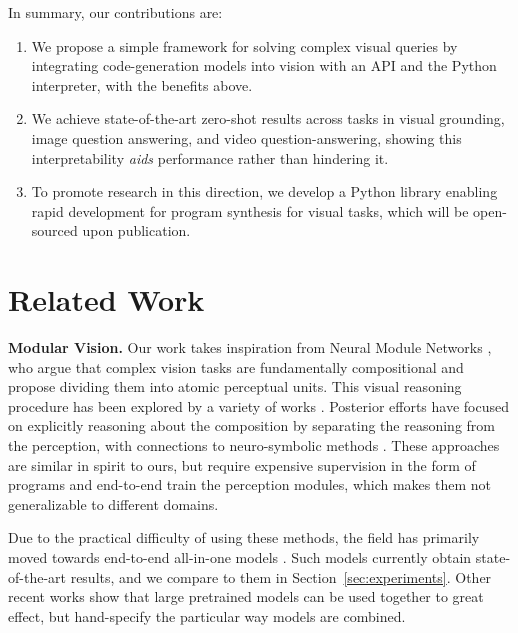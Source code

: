 \documentclass[10pt,twocolumn,letterpaper]{article}
\begin{document}
In summary, our contributions are:
\begin{enumerate}[topsep=0pt,itemsep=-1ex,partopsep=1ex,parsep=1ex]
    \item We propose a simple framework for solving complex visual queries by integrating code-generation models into vision with an API and the Python interpreter, with the benefits above.
    \item We achieve state-of-the-art zero-shot results across tasks in visual grounding, image question answering, and video question-answering, showing this interpretability \textit{aids} performance rather than hindering it.
    \item To promote research in this direction, we develop a Python library enabling rapid development for program synthesis for visual tasks, which will be open-sourced upon publication. 
\end{enumerate}

\section{Related Work}

\textbf{Modular Vision.} Our work takes inspiration from Neural Module Networks \cite{Andreas_2016_CVPR,johnson_inferring_2017}, who argue that complex vision tasks are fundamentally compositional and propose dividing them into atomic perceptual units. This visual reasoning procedure has been explored by a variety of works \cite{kimvisual,Whitehead_2021_CVPR}.
Posterior efforts have focused on explicitly reasoning about the composition by separating the reasoning from the perception, with connections to neuro-symbolic methods \cite{hu_learning_2017,johnson_inferring_2017,yi_neural-symbolic_2018}. These approaches are similar in spirit to ours, but require expensive supervision in the form of programs and end-to-end train the perception modules, which makes them not generalizable to different domains.

Due to the practical difficulty of using these methods, the field has primarily moved towards end-to-end all-in-one models \cite{alayrac2022flamingo,hu2022reveal,huang2023language,li_blip-2_2023}. Such models currently obtain state-of-the-art results, and we compare to them in Section~\ref{sec:experiments}.
Other recent works \cite{zeng2022socraticmodels,reddy2022mumuqa,wang2022language,mao_doubly_2022,menon_visual_2022,gatti2022cofar} show that large pretrained models can be used together to great effect, but hand-specify the particular way models are combined.
\end{document}
